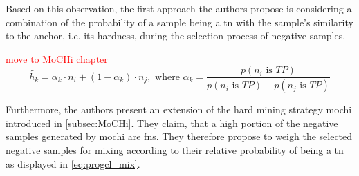 Based on this observation, the first approach the authors propose is 
considering a combination of the probability of a sample being a \ac{tn} 
with the sample's similarity to the anchor, i.e. its hardness, during the selection process of negative samples.

\textcolor{red}{move to MoCHi chapter\\}
\begin{equation}
    \tilde{h_k} =  \alpha_k \cdot n_i + (1-\alpha_k) \cdot  n_j, \text{ where } \alpha_k = \frac{p(n_i \text{ is } TP)}{p(n_i \text{ is } TP) + p(n_j \text{ is } TP)}
    \label{eq:progcl_mix}
\end{equation}

Furthermore, the authors present an extension of the hard mining strategy \ac{mochi} introduced in \autoref{subsec:MoCHi}.
They claim, that a high portion of the negative samples generated by \ac{mochi} are \acp{fn}.
They therefore propose to weigh the selected negative samples for mixing 
according to their relative probability of being a \ac{tn} as displayed in \eqref{eq:progcl_mix}.


